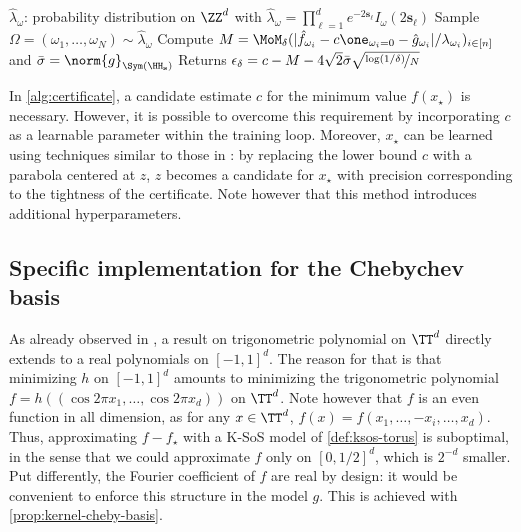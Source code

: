 \documentclass{article}
\begin{document}
\begin{algorithm}\label{alg:certificate}
  \caption{GloptiNets}




  $\hat{\lambda}_\omega$: probability distribution on $\ZZ^d$ with $\hat{\lambda}_\omega = \prod_{\ell = 1}^d e^{-2 \mathbf{s}_\ell} I_\omega(2 \mathbf{s}_\ell)$\;
    Sample $\Omega = (\omega_1, \dots, \omega_N) \sim \hat{\lambda}_\omega$ \;
    Compute $M = \MoM_\delta(|\hat{f}_{\omega_i} - c \one_{\omega_i = 0} - \hat{g}_{\omega_i}| / \lambda_{\omega_i})_{i \in [n]}$ and $\bar{\sigma} = \norm{g}_{\Sym(\HH_{\mathbf{s}})}$\;
    Returns $\epsilon_\delta = c - M - 4\sqrt{2} \bar{\sigma} \sqrt{\nicefrac{\log(1/\delta)}{N}}$\;
\end{algorithm}

\begin{remark}
  In \cref{alg:certificate}, a candidate estimate $c$ for the minimum value $f(x_\star)$ is necessary. However, it is possible to overcome this requirement by incorporating $c$ as a learnable parameter within the training loop. Moreover, $x_\star$ can be learned using techniques similar to those in \cite{rudiFindingGlobalMinima2020}: by replacing the lower bound $c$ with a parabola centered at $z$, $z$ becomes a candidate for $x_\star$ with precision corresponding to the tightness of the certificate. Note however that this method introduces additional hyperparameters.
\end{remark}

\subsection{Specific implementation for the Chebychev basis}
\label{sec:cheby-basis-impl}

As already observed in \cite{bachExponentialConvergenceSumofsquares2023}, a result on trigonometric polynomial on $\TT^d$ directly extends to a real polynomials on $[-1, 1]^d$. The reason for that is that minimizing $h$ on $[-1, 1]^d$ amounts to minimizing the trigonometric polynomial $f = h((\cos 2\pi x_1, \dots, \cos 2\pi x_d))$ on $\TT^d$. Note however that $f$ is an even function in all dimension, as for any $x \in \TT^d$, $f(x) = f(x_1, \dots, -x_i, \dots, x_d)$. Thus, approximating $f - f_\star$ with a K-SoS model of \cref{def:ksos-torus} is suboptimal, in the sense that we could approximate $f$ only on $[0, 1/2]^d$, which is $2^{-d}$ smaller. Put differently, the Fourier coefficient of $f$ are real by design: it would be convenient to enforce this structure in the model $g$. This is achieved with \cref{prop:kernel-cheby-basis}.
\end{document}

